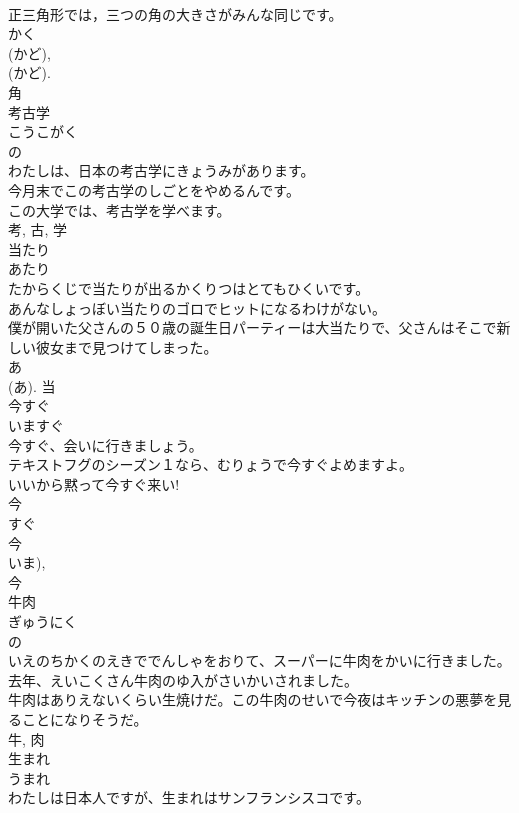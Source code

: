 \documentclass[8pt]{extreport}
\begin{document}
\begin{CJK}{UTF8}{min}
\\	正三角形では，三つの角の大きさがみんな同じです。	
\\	かく 
\\	(かど), 
\\	(かど). 
\\	角	
\\	考古学	
\\	こうこがく	
\\	の 
\\	わたしは、日本の考古学にきょうみがあります。	
\\	今月末でこの考古学のしごとをやめるんです。	
\\	この大学では、考古学を学べます。	
\\	考, 古, 学	
\\	当たり	
\\	あたり	
\\	たからくじで当たりが出るかくりつはとてもひくいです。	
\\	あんなしょっぼい当たりのゴロでヒットになるわけがない。	
\\	僕が開いた父さんの５０歳の誕生日パーティーは大当たりで、父さんはそこで新しい彼女まで見つけてしまった。	
\\	あ 
\\	(あ).	当	
\\	今すぐ	
\\	いますぐ	
\\	今すぐ、会いに行きましょう。	
\\	テキストフグのシーズン１なら、むりょうで今すぐよめますよ。	
\\	いいから黙って今すぐ来い!	
\\	今 
\\	すぐ 
\\	今 
\\	いま), 
\\	今	
\\	牛肉	
\\	ぎゅうにく	
\\	の 
\\	いえのちかくのえきででんしゃをおりて、スーパーに牛肉をかいに行きました。	
\\	去年、えいこくさん牛肉のゆ入がさいかいされました。	
\\	牛肉はありえないくらい生焼けだ。この牛肉のせいで今夜はキッチンの悪夢を見ることになりそうだ。	
\\	牛, 肉	
\\	生まれ	
\\	うまれ	
\\	わたしは日本人ですが、生まれはサンフランシスコです。	

\end{CJK}
\end{document}

